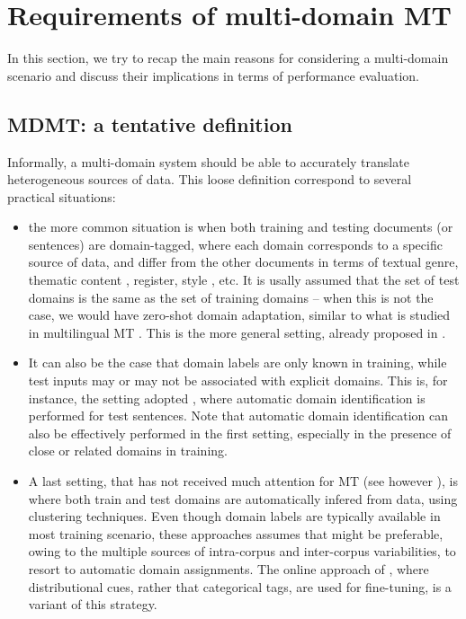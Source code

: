 \documentclass[11pt]{article}
\newcommand{\fyTodo}[1]{\Todo[FY:]{\textcolor{orange}{#1}}}
\begin{document}
\section{Requirements of multi-domain MT \label{sec:requirements}}
In this section, we try to recap the main reasons for considering a multi-domain scenario and discuss their implications in terms of performance evaluation.

\subsection{MDMT: a tentative definition}
Informally, a multi-domain system should be able to accurately translate heterogeneous sources of data. This loose definition correspond to several practical situations:
\begin{itemize}
\item the more common situation is when both training and testing documents (or sentences) are domain-tagged, where each domain corresponds to a specific source of data, and differ from the other documents in terms of textual genre, thematic content \cite{Zhang16topicinformed}, register, style \cite{Niu18multitask}, etc. It is usally assumed that the set of test domains is the same as the set of training domains -- when this is not the case, we would have zero-shot domain adaptation, similar to what is studied in multilingual MT \cite{Firat16multiway,Ha16towards,Johnson17google,Platanios18contextual}. This is the more general setting, already proposed in \cite{Dredze09multidomain}.\fyTodo{do we need a name: such as supervised MDMT ? and mostly supervised MDMT for the second case ?}

\item It can also be the case that domain labels are only known in training, while test inputs may or may not be associated with explicit domains. This is, for instance, the setting adopted \cite{Zeng18multidomain}, where automatic domain identification is performed for test sentences. Note that automatic domain identification can also be effectively performed in the first setting, especially in the presence of close or related domains in training.
  
\item A last setting, that has not received much attention for MT (see however \cite{Sennrich13multidomain}), is where both train and test domains are automatically infered from data, using clustering techniques. Even though domain labels are typically available in most training scenario, these approaches assumes that might be preferable, owing to the multiple sources of intra-corpus and inter-corpus variabilities, to resort to automatic domain assignments. The online approach of , where distributional cues, rather that categorical tags, are used for fine-tuning, is a variant of this strategy.
\end{itemize}
\end{document}
